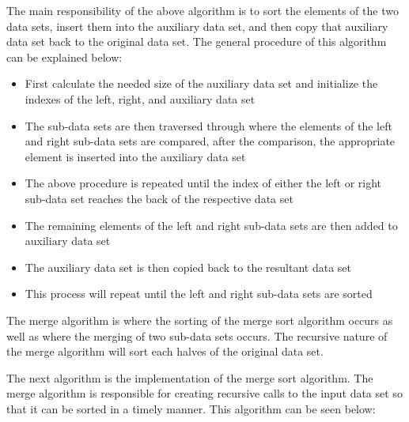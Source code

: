 \begin{highlight}
\noindent The main responsibility of the above algorithm is to sort the elements of the two data sets, insert them into the auxiliary data set, and then copy that auxiliary data set back to the original data set. The general procedure of this algorithm can be explained below:

\begin{itemize}
    \item First calculate the needed size of the auxiliary data set and initialize the indexes of the left, right, and auxiliary data set
    \item The sub-data sets are then traversed through where the elements of the left and right sub-data sets are compared, after the comparison, the appropriate element is inserted into the auxiliary data set
    \item The above procedure is repeated until the index of either the left or right sub-data set reaches the back of the respective data set
    \item The remaining elements of the left and right sub-data sets are then added to auxiliary data set
    \item The auxiliary data set is then copied back to the resultant data set
    \item This process will repeat until the left and right sub-data sets are sorted
\end{itemize}

\noindent The merge algorithm is where the sorting of the merge sort algorithm occurs as well as where the merging of two sub-data sets occurs. The recursive nature of the merge algorithm will sort each halves of the original data set. 

\end{highlight}

The next algorithm is the implementation of the merge sort algorithm. The merge algorithm is responsible for creating recursive calls to the input data set so that it can be sorted in a timely manner. This algorithm can be seen below:

